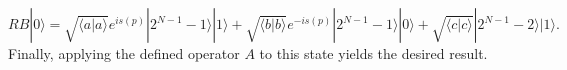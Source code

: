 \documentclass[10pt,letterpaper]{article} %
\begin{document}
$$
RB|0\rangle =\sqrt{\langle a | a \rangle} e^{is(p)} |2^{N-1}-1\rangle |1\rangle + \sqrt{\langle b | b \rangle} e^{-is(p)} |2^{N-1}-1\rangle |0\rangle + \sqrt{\langle c | c \rangle} |2^{N-1}-2\rangle |1\rangle.
$$
Finally, applying the defined operator $A$ to this state yields the desired result.
 
\end{document}
